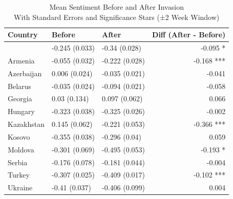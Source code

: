 \begin{table}[!t]
\caption*{
{\large Mean Sentiment Before and After Invasion} \\ 
{\small With Standard Errors and Significance Stars (±2 Week Window)}
} 
\fontsize{12.0pt}{14.4pt}\selectfont
\begin{tabular*}{\linewidth}{@{\extracolsep{\fill}}lllr}
\toprule
Country & Before & After & Diff (After - Before) \\ 
\midrule\addlinespace[2.5pt]
{Albania} & {-0.245
(0.033)} & {-0.34
(0.028)} & {-0.095 *} \\ 
{Armenia} & {-0.055
(0.032)} & {-0.222
(0.028)} & {-0.168 ***} \\ 
{Azerbaijan} & {0.006
(0.024)} & {-0.035
(0.021)} & {-0.041 } \\ 
{Belarus} & {-0.035
(0.024)} & {-0.094
(0.021)} & {-0.058 } \\ 
{Georgia} & {0.03
(0.134)} & {0.097
(0.062)} & {0.066 } \\ 
{Hungary} & {-0.323
(0.038)} & {-0.325
(0.026)} & {-0.002 } \\ 
{Kazakhstan} & {0.145
(0.062)} & {-0.221
(0.053)} & {-0.366 ***} \\ 
{Kosovo} & {-0.355
(0.038)} & {-0.296
(0.04)} & {0.059 } \\ 
{Moldova} & {-0.301
(0.069)} & {-0.495
(0.053)} & {-0.193 *} \\ 
{Serbia} & {-0.176
(0.078)} & {-0.181
(0.044)} & {-0.004 } \\ 
{Turkey} & {-0.307
(0.025)} & {-0.409
(0.017)} & {-0.102 ***} \\ 
{Ukraine} & {-0.41
(0.037)} & {-0.406
(0.099)} & {0.004 } \\ 
\bottomrule
\end{tabular*}
\end{table}

